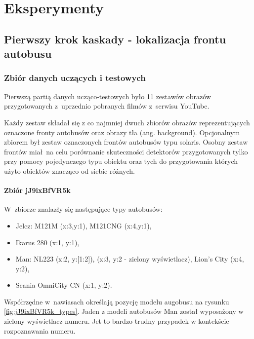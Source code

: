 \chapter{Eksperymenty}

\section{Pierwszy krok kaskady - lokalizacja frontu autobusu}

\subsection{Zbiór danych uczących i testowych}

Pierwszą partią danych ucząco-testowych było 11 zestawów obrazów
przygotowanych z~uprzednio pobranych filmów z~serwisu YouTube.

Każdy zestaw składał się z co najmniej dwuch zbiorów obrazów 
reprezentujących oznaczone fronty autobusów oraz obrazy tła
(ang. background). Opcjonalnym zbiorem był zestaw oznaczonych 
frontów autobusów typu solaris. Osobny zestaw frontów miał na celu
porównanie skuteczności detektorów przygotowanych tylko przy pomocy
pojedynczego typu obiektu oraz tych do przygotowania których użyto
obiektów znacząco od siebie różnych.

\newpage
\subsubsection{Zbiór jJ9ixBfVR5k}

W~zbiorze znalazły się następujące typy autobusów: 
\begin{itemize}
    \item Jelcz: M121M (x:3,y:1), M121CNG (x:4,y:1),
    \item Ikarus 280 (x:1, y:1),
    \item Man: NL223 (x:2, y:[1:2]), (x:3, y:2 - zielony wyświetlacz),
        Lion's City (x:4, y:2),
    \item Scania OmniCity CN (x:1, y:2). 
\end{itemize}
Współrzędne w~nawiasach określają pozycję modelu augobusu na rysunku
\ref{fig:jJ9ixBfVR5k_types}.
Jaden z modeli autobusów Man został wyposażony w zielony wyświetlacz numeru.
Jet to bardzo trudny przypadek w kontekście rozpoznawania numeru.

